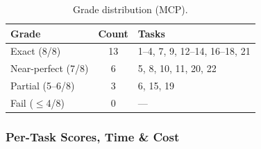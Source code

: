 \begin{table}[h]
\centering
\caption{Grade distribution (MCP).}\label{tab:grade-mcp}
\begin{tabular}{lcl}
\toprule
\textbf{Grade} & \textbf{Count} & \textbf{Tasks} \\
\midrule
Exact (8/8)        & 13 & 1--4, 7, 9, 12--14, 16--18, 21 \\
Near-perfect (7/8) &  6 & 5, 8, 10, 11, 20, 22 \\
Partial (5--6/8)   &  3 & 6, 15, 19 \\
Fail ($\le$4/8)    &  0 & --- \\
\bottomrule
\end{tabular}
\end{table}

\subsubsection{Per-Task Scores, Time \& Cost}

